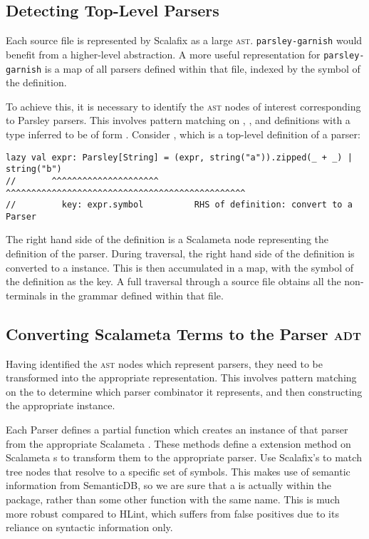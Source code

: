 \documentclass[../../main.tex]{subfiles}
\begin{document}
\subsection{Detecting Top-Level Parsers}
Each source file is represented by Scalafix as a large \textsc{ast}.
\texttt{parsley-garnish} would benefit from a higher-level abstraction.
A more useful representation for \texttt{parsley-garnish} is a map of all parsers defined within that file, indexed by the symbol of the definition.

To achieve this, it is necessary to identify the \textsc{ast} nodes of interest corresponding to Parsley parsers.
This involves pattern matching on , , and  definitions with a type inferred to be of form .
Consider , which is a top-level definition of a parser:
\begin{verbatim}
lazy val expr: Parsley[String] = (expr, string("a")).zipped(_ + _) | string("b")
//       ^^^^^^^^^^^^^^^^^^^^^   ^^^^^^^^^^^^^^^^^^^^^^^^^^^^^^^^^^^^^^^^^^^^^^^
//         key: expr.symbol          RHS of definition: convert to a Parser
\end{verbatim}
The right hand side of the definition is a Scalameta  node representing the definition of the parser.
During traversal, the right hand side of the definition is converted to a \scala{Parser} instance.
This is then accumulated in a map, with the symbol of the definition as the key.
A full traversal through a source file obtains all the non-terminals in the grammar defined within that file.

\subsection{Converting Scalameta Terms to the Parser \textsc{adt}}
Having identified the \textsc{ast} nodes which represent parsers, they need to be transformed into the appropriate  representation.
This involves pattern matching on the \scala{Term} to determine which parser combinator it represents, and then constructing the appropriate  instance.

Each Parser defines a partial function  which creates an instance of that parser from the appropriate Scalameta .
These \scala{fromTerm} methods define a \scala{toParser} extension method on Scalameta \scala{Term}s to transform them to the appropriate parser.
Use Scalafix's \scala{SymbolMatcher} to match tree nodes that resolve to a specific set of symbols.
This makes use of semantic information from SemanticDB, so we are sure that a \scala{<*>} is actually within the  package, rather than some other function with the same name.
This is much more robust compared to HLint, which suffers from false positives due to its reliance on syntactic information only.
\end{document}
